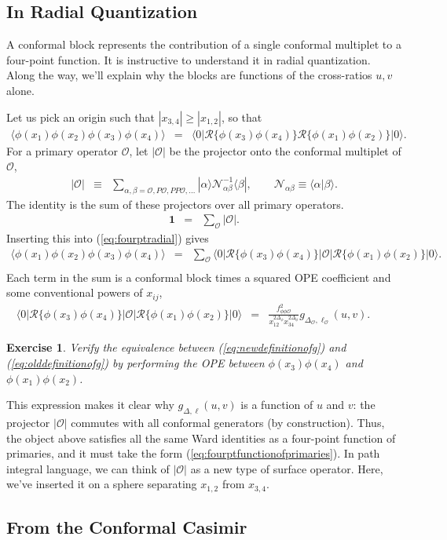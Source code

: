 \documentclass{ws-rv9x6}
\newcommand\be{\begin{eqnarray}}
\newcommand\ee{\end{eqnarray}}
\newcommand\f\phi
\newcommand\cO{\mathcal{O}}
\newcommand\<\langle
\renewcommand\>\rangle
\newcommand\nn{\nonumber}
\renewcommand\.{\cdot}
\newcommand\De{\Delta}
\renewcommand\b\beta
\renewcommand\a\alpha
\newtheorem{exercise}{Exercise}[section]
\begin{document}
\subsection{In Radial Quantization}

A conformal block represents the contribution of a single conformal multiplet to a four-point function.  It is instructive to understand it in radial quantization.  Along the way, we'll explain why the blocks are functions of the cross-ratios $u,v$ alone.

Let us pick an origin such that $|x_{3,4}|\geq |x_{1,2}|$, so that
\be
\label{eq:fourptradial}
\<\f(x_1)\f(x_2)\f(x_3)\f(x_4)\> &=& \<0|\mathcal{R}\{\f(x_3)\f(x_4)\}\mathcal{R}\{\f(x_1)\f(x_2)\}|0\>.\quad
\ee
For a primary operator $\cO$, let $|\cO|$ be the projector onto the conformal multiplet of $\cO$,
\be
|\cO| &\equiv& \sum_{\a,\b=\cO,P\cO,PP\cO,\dots} |\a\>\mathcal{N}^{-1}_{\a\b}\<\b|,\qquad
\mathcal{N}_{\a\b} \equiv \<\a|\b\>.
\ee
The identity is the sum of these projectors over all primary operators.
\be
\mathbf{1} &=& \sum_\cO |\cO|.
\ee
Inserting this into (\ref{eq:fourptradial}) gives
\be
\label{eq:insertingprojector}
\<\f(x_1)\f(x_2)\f(x_3)\f(x_4)\> &=& \sum_\cO\<0|\mathcal{R}\{\f(x_3)\f(x_4)\}|\cO|\mathcal{R}\{\f(x_1)\f(x_2)\}|0\>.\nn\\
\ee
Each term in the sum is a conformal block times a squared OPE coefficient and some conventional powers of $x_{ij}$,
\be
\label{eq:newdefinitionofg}
\<0|\mathcal{R}\{\f(x_3)\f(x_4)\}|\cO|\mathcal{R}\{\f(x_1)\f(x_2)\}|0\> &=& \frac{f_{\f\f\cO}^2}{x_{12}^{2\De_\f}x_{34}^{2\De_\f}}g_{\De_\cO,\ell_\cO}(u,v).\qquad
\ee
\begin{exercise}
Verify the equivalence between (\ref{eq:newdefinitionofg}) and (\ref{eq:olddefinitionofg}) by performing the OPE between $\f(x_3)\f(x_4)$ and $\f(x_1)\f(x_2)$.
\end{exercise}

This expression makes it clear why $g_{\De,\ell}(u,v)$ is a function of $u$ and $v$: the projector $|\cO|$ commutes with all conformal generators (by construction).  Thus, the object above satisfies all the same Ward identities as a four-point function of primaries, and it must take the form (\ref{eq:fourptfunctionofprimaries}).  In path integral language, we can think of $|\cO|$ as a new type of  surface operator.  Here, we've inserted it on a sphere separating $x_{1,2}$ from $x_{3,4}$.

\subsection{From the Conformal Casimir}
\end{document}
